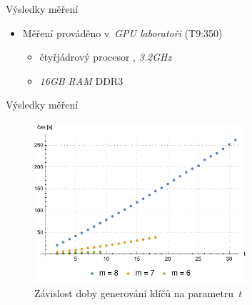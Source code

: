 \documentclass{beamer}
\begin{document}
\begin{frame}{Výsledky měření}

            \pause

    \begin{itemize}
        \item Měření prováděno v~\emph{GPU laboratoři} (T9:350)
            \begin{itemize}
                \item čtyřjádrový procesor , \emph{3.2\;GHz}
                \item \emph{16\;GB RAM} DDR3
            \end{itemize}
    \end{itemize}

\end{frame}

\begin{frame}{Výsledky měření}

    \begin{figure}[!ht]
        \centering
        \includegraphics[width=0.7\textwidth]{../../implementace/grafy/listplot_m6-8_generovani.pdf}
        \caption[Časová složitost generování klíčů]{
            Závislost doby generování klíčů na parametru~$t$
        }
        \label{obr_mereni_t_gen}
    \end{figure}

\end{frame}
\end{document}
